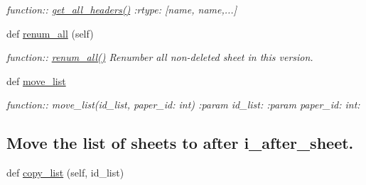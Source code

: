 \begin{DoxyCompactItemize}
\begin{DoxyCompactList}\small\item\em function\+:\+: \hyperlink{classplume-creator_1_1src_1_1plume_1_1data_1_1tree_1_1db__tree_1_1_db_tree_a664bf0247445d243dbd9d48604da58d5}{get\+\_\+all\+\_\+headers()} \+:rtype\+: \mbox{[}name, name,...\mbox{]} \end{DoxyCompactList}\item 
def \hyperlink{classplume-creator_1_1src_1_1plume_1_1data_1_1tree_1_1db__tree_1_1_db_tree_a626a7f0be9e52b5d357505c548c297e0}{renum\+\_\+all} (self)
\begin{DoxyCompactList}\small\item\em function\+:\+: \hyperlink{classplume-creator_1_1src_1_1plume_1_1data_1_1tree_1_1db__tree_1_1_db_tree_a626a7f0be9e52b5d357505c548c297e0}{renum\+\_\+all()} Renumber all non-\/deleted sheet in this version. \end{DoxyCompactList}\item 
def \hyperlink{classplume-creator_1_1src_1_1plume_1_1data_1_1tree_1_1db__tree_1_1_db_tree_a4fe46874c24fd3a45bffafd76857a488}{move\+\_\+list}
\begin{DoxyCompactList}\small\item\em function\+:\+: move\+\_\+list(id\+\_\+list, paper\+\_\+id\+: int) \+:param id\+\_\+list\+: \+:param paper\+\_\+id\+: int\+: \subsection*{Move the list of sheets to after i\+\_\+after\+\_\+sheet.}\end{DoxyCompactList}\item 
def \hyperlink{classplume-creator_1_1src_1_1plume_1_1data_1_1tree_1_1db__tree_1_1_db_tree_af6dbffc5f5977ae0e17eb16b0d1052d7}{copy\+\_\+list} (self, id\+\_\+list)\hypertarget{classplume-creator_1_1src_1_1plume_1_1data_1_1tree_1_1db__tree_1_1_db_tree_af6dbffc5f5977ae0e17eb16b0d1052d7}{}\label{classplume-creator_1_1src_1_1plume_1_1data_1_1tree_1_1db__tree_1_1_db_tree_af6dbffc5f5977ae0e17eb16b0d1052d7}


\end{DoxyCompactItemize}
